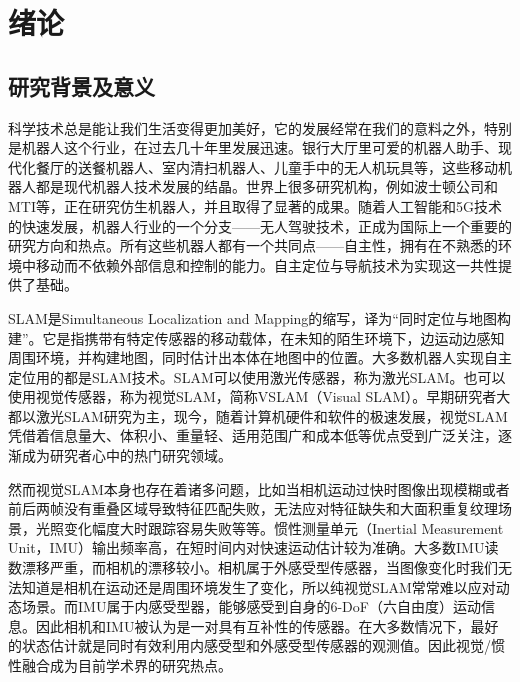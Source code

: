 \chapter{绪论}
\label{chap:intro}
\section{研究背景及意义}

科学技术总是能让我们生活变得更加美好，它的发展经常在我们的意料之外，特别是机器人这个行业，在过去几十年里发展迅速。银行大厅里可爱的机器人助手、现代化餐厅的送餐机器人、室内清扫机器人、儿童手中的无人机玩具等，这些移动机器人都是现代机器人技术发展的结晶。世界上很多研究机构，例如波士顿公司和MTI等，正在研究仿生机器人，并且取得了显著的成果。随着人工智能和5G技术的快速发展，机器人行业的一个分支——无人驾驶技术，正成为国际上一个重要的研究方向和热点。所有这些机器人都有一个共同点——自主性，拥有在不熟悉的环境中移动而不依赖外部信息和控制的能力。自主定位与导航技术为实现这一共性提供了基础。

SLAM是Simultaneous Localization and Mapping的缩写，译为“同时定位与地图构建”。它是指携带有特定传感器的移动载体，在未知的陌生环境下，边运动边感知周围环境，并构建地图，同时估计出本体在地图中的位置。大多数机器人实现自主定位用的都是SLAM技术。SLAM可以使用激光传感器，称为激光SLAM。也可以使用视觉传感器，称为视觉SLAM，简称VSLAM（Visual SLAM）。早期研究者大都以激光SLAM研究为主，现今，随着计算机硬件和软件的极速发展，视觉SLAM凭借着信息量大、体积小、重量轻、适用范围广和成本低等优点受到广泛关注，逐渐成为研究者心中的热门研究领域。

然而视觉SLAM本身也存在着诸多问题，比如当相机运动过快时图像出现模糊或者前后两帧没有重叠区域导致特征匹配失败，无法应对特征缺失和大面积重复纹理场景，光照变化幅度大时跟踪容易失败等等。惯性测量单元（Inertial Measurement Unit，IMU）输出频率高，在短时间内对快速运动估计较为准确。大多数IMU读数漂移严重，而相机的漂移较小。相机属于外感受型传感器，当图像变化时我们无法知道是相机在运动还是周围环境发生了变化，所以纯视觉SLAM常常难以应对动态场景。而IMU属于内感受型器，能够感受到自身的6-DoF（六自由度）运动信息。因此相机和IMU被认为是一对具有互补性的传感器。在大多数情况下，最好的状态估计就是同时有效利用内感受型和外感受型传感器的观测值。因此视觉/惯性融合成为目前学术界的研究热点。

